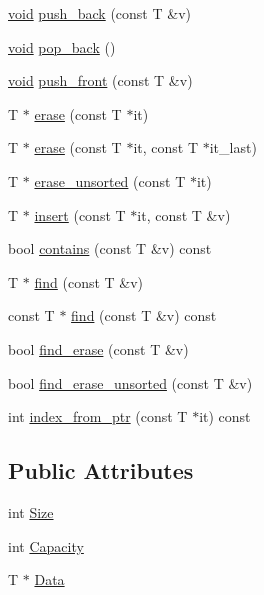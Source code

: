 \begin{DoxyCompactItemize}
\hyperlink{imgui__impl__opengl3__loader_8h_ac668e7cffd9e2e9cfee428b9b2f34fa7}{void} \hyperlink{structImVector_aab5df48e0711a48bd12f3206e08c4108}{push\+\_\+back} (const T \&v)
\item 
\hyperlink{imgui__impl__opengl3__loader_8h_ac668e7cffd9e2e9cfee428b9b2f34fa7}{void} \hyperlink{structImVector_a3db7ce62d3c429effdb893fbf7148c1c}{pop\+\_\+back} ()
\item 
\hyperlink{imgui__impl__opengl3__loader_8h_ac668e7cffd9e2e9cfee428b9b2f34fa7}{void} \hyperlink{structImVector_a168658df8e0e1df5698ebe7a69946389}{push\+\_\+front} (const T \&v)
\item 
T $\ast$ \hyperlink{structImVector_af44d62675eb411f655da9cced5237456}{erase} (const T $\ast$it)
\item 
T $\ast$ \hyperlink{structImVector_a061554df4aff14deece181d6c46abb9f}{erase} (const T $\ast$it, const T $\ast$it\+\_\+last)
\item 
T $\ast$ \hyperlink{structImVector_af3bb8157615f4d38b1faf04a5e11b96f}{erase\+\_\+unsorted} (const T $\ast$it)
\item 
T $\ast$ \hyperlink{structImVector_a7859d07f4a90efd2d9fd9ad5c1bf43c6}{insert} (const T $\ast$it, const T \&v)
\item 
bool \hyperlink{structImVector_a2e7860fbde1c721f168b6262d8f14aec}{contains} (const T \&v) const
\item 
T $\ast$ \hyperlink{structImVector_a1fd56218ff1441843df8c9f1aef54fdc}{find} (const T \&v)
\item 
const T $\ast$ \hyperlink{structImVector_ada7d8e0e66b8619562cb2fa3830c8f8d}{find} (const T \&v) const
\item 
bool \hyperlink{structImVector_a4e9214ecaa413240f76223500dbed912}{find\+\_\+erase} (const T \&v)
\item 
bool \hyperlink{structImVector_a07f501e40783436616156682ec668327}{find\+\_\+erase\+\_\+unsorted} (const T \&v)
\item 
int \hyperlink{structImVector_a3fd48379f807eeb01fb9da39afa30dc7}{index\+\_\+from\+\_\+ptr} (const T $\ast$it) const
\end{DoxyCompactItemize}
\subsection*{Public Attributes}
\begin{DoxyCompactItemize}
\item 
int \hyperlink{structImVector_abbfd157947f66280d27b21d70a16df8d}{Size}
\item 
int \hyperlink{structImVector_abd24482b4d30d22e37582e521e5bfb33}{Capacity}
\item 
T $\ast$ \hyperlink{structImVector_ac0e46e8b30cb079d93c8f0aad7d7cbd0}{Data}
\end{DoxyCompactItemize}


